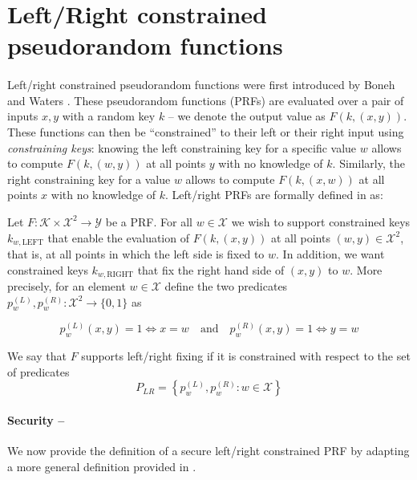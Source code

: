 \section{Left/Right constrained pseudorandom functions}

\paragraph{} Left/right constrained pseudorandom functions were first introduced by Boneh and Waters \cite{LRPRF}. These pseudorandom functions (PRFs) are evaluated over a pair of inputs $x,y$ with a random key $k$ -- we denote the output value as $F(k, (x,y))$. These functions can then be ``constrained'' to their left or their right input using \textit{constraining keys}: knowing the left constraining key for a specific value $w$ allows to compute $F(k, (w,y))$ at all points $y$ with no knowledge of $k$. Similarly, the right constraining key for a value $w$ allows to compute $F(k, (x,w))$ at all points $x$ with no knowledge of $k$. Left/right PRFs are formally defined in \cite{LRPRF} as:

\begin{definition}
	Let $F: \mathcal{K} \times \mathcal{X}^2 \rightarrow \mathcal{Y}$ be a PRF. For all $w \in \mathcal{X}$ we wish to support constrained keys $k_{w, \mathrm{LEFT}}$ that enable the evaluation of $F(k, (x,y))$ at all points $(w,y)\in \mathcal{X}^2$, that is, at all points in which the left side is fixed to $w$. In addition, we want constrained keys $k_{w,\mathrm{RIGHT}}$ that fix the right hand side of $(x,y)$ to $w$. More precisely, for an element $w \in \mathcal{X}$ define the two predicates $p_w^{(L)}, p_w^{(R)}: \mathcal{X}^2 \rightarrow \{0,1\}$ as
	
	$$
		p_w^{(L)}(x,y) = 1 \iff x = w \quad \mathrm{and} \quad p_w^{(R)}(x,y) = 1 \iff y = w 
	$$
	
	We say that $F$ supports left/right fixing if it is constrained with respect to the set of predicates
	$$
		P_{LR}=\left\{ p_w^{(L)}, p_w^{(R)}: w\in \mathcal{X} \right\}
	$$
	
\end{definition}

\paragraph{Security -- } We now provide the definition of a secure left/right constrained PRF by adapting a more general definition provided in \cite{LRPRF}.

